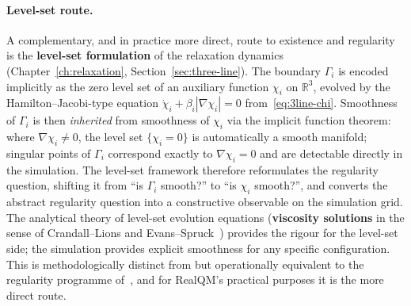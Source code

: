 \paragraph{Level-set route.}
A complementary, and in practice more direct, route to existence and regularity is the \textbf{level-set formulation} of the relaxation dynamics (Chapter~\ref{ch:relaxation}, Section~\ref{sec:three-line}). The boundary $\Gamma_i$ is encoded implicitly as the zero level set of an auxiliary function $\chi_i$ on $\mathbb{R}^3$, evolved by the Hamilton--Jacobi-type equation $\dot\chi_i + \beta_i |\nabla \chi_i| = 0$ from~\eqref{eq:3line-chi}. Smoothness of $\Gamma_i$ is then \emph{inherited} from smoothness of $\chi_i$ via the implicit function theorem: where $\nabla \chi_i \ne 0$, the level set $\{\chi_i = 0\}$ is automatically a smooth manifold; singular points of $\Gamma_i$ correspond exactly to $\nabla \chi_i = 0$ and are detectable directly in the simulation. The level-set framework therefore reformulates the regularity question, shifting it from ``is $\Gamma_i$ smooth?'' to ``is $\chi_i$ smooth?'', and converts the abstract regularity question into a constructive observable on the simulation grid. The analytical theory of level-set evolution equations (\textbf{viscosity solutions} in the sense of Crandall--Lions and Evans--Spruck~\cite{CrandallLions83, EvansSpruck91}) provides the rigour for the level-set side; the simulation provides explicit smoothness for any specific configuration. This is methodologically distinct from but operationally equivalent to the regularity programme of~\cite{AltCaffarelli81, CaffarelliLin08}, and for RealQM's practical purposes it is the more direct route.

